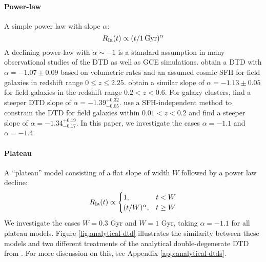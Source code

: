 \documentclass[twocolumn,twocolappendix,linenumbers]{aastex631}
\begin{document}

\paragraph{Power-law} A simple power law with slope $\alpha$:
\begin{equation}
    R_{\rm Ia}(t) \propto (t/1\,\rm{Gyr})^\alpha
    \label{eq:powerlaw-dtd}
\end{equation}
A declining power-law with $\alpha\sim-1$ is a standard assumption in many observational studies of the DTD as well as GCE simulations. \citet{Maoz2017-CosmicDTD} obtain a DTD with $\alpha=-1.07\pm0.09$ based on volumetric rates and an assumed cosmic SFH for field galaxies in redshift range $0\leq z\leq 2.25$. \citet{Wiseman2021-DESRates} obtain a similar slope of $\alpha=-1.13\pm0.05$ for field galaxies in the redshift range $0.2<z<0.6$. For galaxy clusters, \citet{Maoz2017-CosmicDTD} find a steeper DTD slope of $\alpha=-1.39^{+0.32}_{-0.05}$. \citet{Heringer2019-FieldGalaxyDTD} use a SFH-independent method to constrain the DTD for field galaxies within $0.01<z<0.2$ and find a steeper slope of $\alpha=-1.34^{+0.19}_{-0.17}$.
In this paper, we investigate the cases $\alpha=-1.1$ and $\alpha=-1.4$.

\paragraph{Plateau} A ``plateau'' model consisting of a flat slope of width $W$ followed by a power law decline:
\begin{equation}
    R_{\rm Ia}(t) \propto
    \begin{cases}
        1, & t < W \\
        (t/W)^\alpha, & t \ge W
    \end{cases}
    \label{eq:plateau-dtd}
\end{equation}
We investigate the cases $W=0.3$ Gyr and $W=1$ Gyr, taking $\alpha=-1.1$ for all plateau models. Figure \ref{fig:analytical-dtd} illustrates the similarity between these models and two different treatments of the analytical double-degenerate DTD from \citet{Greggio2005-AnalyticalRates}. For more discussion on this, see Appendix \ref{app:analytical-dtds}.
\end{document}
